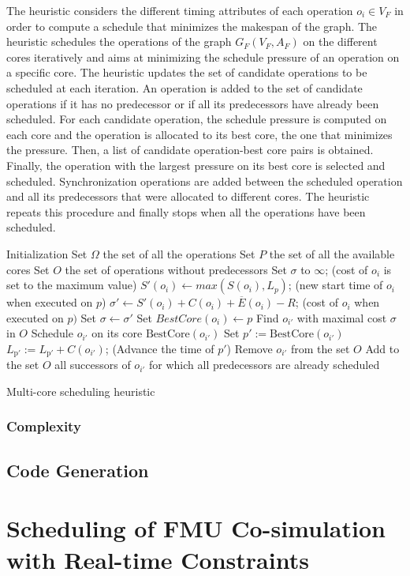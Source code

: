 The heuristic considers the different timing attributes of each operation $o_i \in V_F$ in order to compute a schedule that minimizes the makespan of the graph. The heuristic schedules the operations of the graph $G_F(V_F,A_F)$ on the different cores iteratively and aims at minimizing the schedule pressure of an operation on a specific core. %
The heuristic updates the set of candidate operations to be scheduled at each iteration. An operation is added to the set of candidate operations if it has no predecessor or if all its predecessors have already been scheduled. For each candidate operation, the schedule pressure is computed on each core and the operation is allocated to its best core, the one that minimizes the pressure. Then, a list of candidate operation-best core pairs is obtained. Finally, the operation with the largest pressure on its best core is selected and scheduled. Synchronization operations are added between the scheduled operation and all its predecessors that were allocated to different cores. The heuristic repeats this procedure and finally stops when all the operations have been scheduled.   

\begin{algorithm}[!htp]		
	  Initialization\;
		Set $\Omega$ the set of all the operations\;  
		Set $P$ the set of all the available cores\; 
 		Set $O$ the set of operations without predecessors\;  		
 		\While{$\O \neq \emptyset$}
		{
			{
 				Set $\sigma$ to $\infty$; (cost of $o_i$ is set to the maximum value)\;
				{
  				$S'(o_i) \leftarrow max(S(o_i) , L_p)$; (new start time of $o_i$ when executed on $p$)\;
  				$\sigma' \leftarrow S'(o_i) + C(o_i) + \overline{E}(o_i) - R$; (cost of $o_i$ when executed on $p)$\;
					{
  					Set $\sigma \leftarrow \sigma'$\;
  					Set $BestCore(o_i) \leftarrow p$\;
  				}
  			}
  		 }
  		 Find $o_{i'}$ with maximal cost $\sigma$ in $O$\; 
  		 Schedule $o_{i'}$ on its core $\mathrm{BestCore}(o_{i'})$\;
  		 Set $p' := \mathrm{BestCore}(o_{i'})$\;
  		 $L_{\mathrm{p'}} := L_{\mathrm{p'}} + C(o_{i'})$; (Advance the time of $p'$)\;
  		 Remove $o_{i'}$ from the set $O$\;
  		 Add to the set $O$ all successors of $o_{i'}$ for which all predecessors are already scheduled\;
		}
	\caption{Multi-core scheduling heuristic}
	\label{algo:sched}
\end{algorithm}

\subsubsection{Complexity}

\subsection{Code Generation}

\section{Scheduling of FMU Co-simulation with Real-time Constraints}



